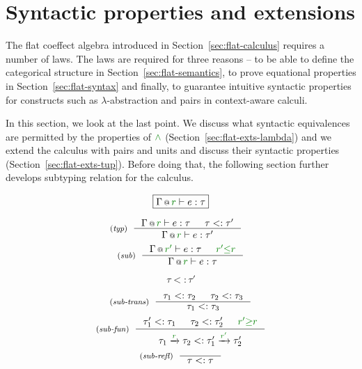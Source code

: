 \section{Syntactic properties and extensions}
\label{sec:flat-exts}

The flat coeffect algebra introduced in Section~\ref{sec:flat-calculus} requires a number of laws.
The laws are required for three reasons -- to be able to define the categorical structure
in Section~\ref{sec:flat-semantics}, to prove equational properties in Section~\ref{sec:flat-syntax}
and finally, to guarantee intuitive syntactic properties for constructs such as 
$\lambda$-abstraction and pairs in context-aware calculi.

In this section, we look at the last point. We discuss what syntactic equivalences are permitted
by the properties of $\czip$ (Section~\ref{sec:flat-exts-lambda}) and we extend the calculus with 
pairs and units and discuss their syntactic properties (Section~\ref{sec:flat-exts-tup}). Before
doing that, the following section further develops subtyping relation for the calculus.


\begin{figure}[t]

\begin{equation*}
\boxed{\coctx{\Gamma}{\cclrd{r}} \vdash e : \tau}
\end{equation*}

\begin{equation*}
\tyrule{typ}
  { \coctx{\Gamma}{\cclrd{r}} \vdash e : \tau & \tau <: \tau' }
  { \coctx{\Gamma}{\cclrd{r}} \vdash e : \tau' }
\quad
\end{equation*}
\begin{equation*}
\tyrule{sub}
  {\coctx{\Gamma}{\cclrd{r'}} \vdash e : \tau & \cclrd{r'} \cleq \cclrd{r} }
  {\coctx{\Gamma}{\cclrd{r}} \vdash e : \tau }
\end{equation*}

\begin{equation*}
\boxed{\tau <: \tau'}
\end{equation*}

\begin{equation*}
\tyrule{sub-trans}
  { \tau_1 <: \tau_2 & \tau_2 <: \tau_3 }
  { \tau_1 <: \tau_3  }
\end{equation*}
\begin{equation*}
\tyrule{sub-fun}
  { \tau_1' <: \tau_1 & \tau_2 <: \tau_2' & \cclrd{r'} \cgeq \cclrd{r} }
  { \tau_1 \xrightarrow{\cclrd{r}} \tau_2 <: \tau_1' \xrightarrow{\cclrd{r'}} \tau_2' }
\end{equation*}
\begin{equation*}
\tyrule{sub-refl}
  { }
  { \tau <: \tau }
\end{equation*}

\label{fig:flat-types-sub}
\end{figure}

